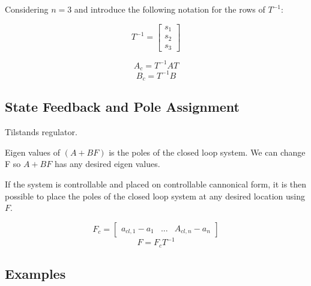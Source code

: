 Considering $n=3$ and introduce the following notation for the rows of $T^{-1}$:

$$T^{-1} = \begin{bmatrix}
		s_1 \\
		s_2 \\
		s_3
	\end{bmatrix} $$


$$A_c = T^{-1}AT$$
$$B_c = T^{-1}B$$
\subsection{State Feedback and Pole Assignment}
Tilstands regulator.


Eigen values of $(A+BF)$ is the poles of the closed loop system.
We can change F so $A+BF$ has any desired eigen values.

If the system is controllable and placed on controllable cannonical form, it is then possible
to place the poles of the closed loop system at any desired location using $F$.


$$F_c = \begin{bmatrix} a_{cl,1} - a_1 & ... & A_{cl,n} - a_n \end{bmatrix} $$
$$ F = F_c T^{-1}$$

\subsection{Examples}
